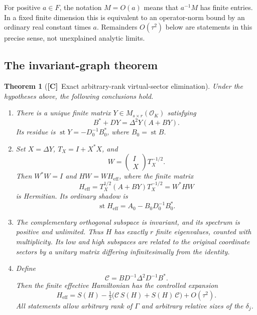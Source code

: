\documentclass[11pt,oneside]{article}
\numberwithin{equation}{section}
\theoremstyle{plain}
\newtheorem{theorem}{Theorem}[section]
\theoremstyle{definition}
\theoremstyle{remark}
\newcommand{\OO}{\mathcal O}
\newcommand{\Heff}{H_{\mathrm{eff}}}
\newcommand{\Corr}{\mathcal C}
\DeclareMathOperator{\st}{st}
\newcommand{\TC}{\textcolor{TierC}{\textsf{\bfseries[C]}}}
\begin{document}
For positive $a\in F$, the notation $M=O(a)$ means that $a^{-1}M$ has finite entries. In a fixed finite dimension this is equivalent to an operator-norm bound by an ordinary real constant times $a$. Remainders $O(\tau^2)$ below are statements in this precise sense, not unexplained analytic limits.

\subsection{The invariant-graph theorem}
\begin{theorem}[\TC\ Exact arbitrary-rank virtual-sector elimination]\label{qgs:thm:elimination}
Under the hypotheses above, the following conclusions hold.
\begin{enumerate}[label=\textup{(\roman*)},leftmargin=2em,itemsep=3pt]
\item There is a unique finite matrix $Y\in M_{s\times r}(\OO_K)$ satisfying
\begin{equation}\label{qgs:eq:riccati}
 B^*+DY=\Delta^2Y(A+BY).
\end{equation}
Its residue is $\st Y=-D_0^{-1}B_0^*$, where $B_0=\st B$.
\item Set $X=\Delta Y$, $T_X=I+X^*X$, and
\begin{equation}\label{qgs:eq:W}
 W=\begin{pmatrix}I\\X\end{pmatrix}T_X^{-1/2}.
\end{equation}
Then $W^*W=I$ and $HW=W\Heff$, where the finite matrix
\begin{equation}\label{qgs:eq:Kexact}
 \Heff=T_X^{1/2}(A+BY)T_X^{-1/2}=W^*HW
\end{equation}
is Hermitian. Its ordinary shadow is
\begin{equation}\label{qgs:eq:Kshadow}
 \st\Heff=A_0-B_0D_0^{-1}B_0^*.
\end{equation}
\item The complementary orthogonal subspace is invariant, and its spectrum is positive and unlimited. Thus $H$ has exactly $r$ finite eigenvalues, counted with multiplicity. Its low and high subspaces are related to the original coordinate sectors by a unitary matrix differing infinitesimally from the identity.
\item Define
\begin{equation}\label{qgs:eq:C}
 \Corr=BD^{-1}\Delta^2D^{-1}B^*.
\end{equation}
Then the finite effective Hamiltonian has the controlled expansion
\begin{equation}\label{qgs:eq:Kcorrection}
 \boxed{\quad \Heff=S(H)-\tfrac12\bigl(\Corr\,S(H)+S(H)\,\Corr\bigr)+O(\tau^2).\quad}
\end{equation}
All statements allow arbitrary rank of $\Gamma$ and arbitrary relative sizes of the $\delta_j$.
\end{enumerate}
\end{theorem}
\end{document}
